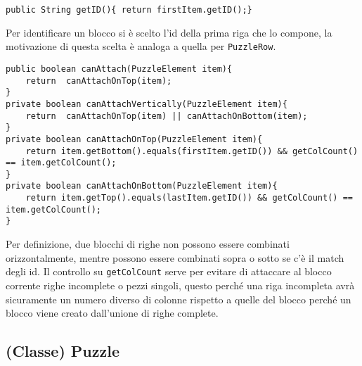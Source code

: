\documentclass[a4paper, 11pt]{article}
\begin{document}
\begin{lstlisting}
public String getID(){ return firstItem.getID();}
\end{lstlisting}
Per identificare un blocco si è scelto l'id della prima riga che lo compone, la motivazione di questa scelta è analoga a quella per \texttt{PuzzleRow}.

\begin{lstlisting}
public boolean canAttach(PuzzleElement item){
    return  canAttachOnTop(item);
}
private boolean canAttachVertically(PuzzleElement item){
    return  canAttachOnTop(item) || canAttachOnBottom(item);
}
private boolean canAttachOnTop(PuzzleElement item){
    return item.getBottom().equals(firstItem.getID()) && getColCount() == item.getColCount();
}
private boolean canAttachOnBottom(PuzzleElement item){
    return item.getTop().equals(lastItem.getID()) && getColCount() == item.getColCount();
}
\end{lstlisting}
Per definizione, due blocchi di righe non possono essere combinati orizzontalmente, mentre possono essere combinati sopra o sotto se c'è il match degli id.
Il controllo su \texttt{getColCount} serve per evitare di attaccare al blocco corrente righe incomplete o pezzi singoli, questo perché una riga incompleta avrà sicuramente un numero diverso di colonne rispetto a quelle del blocco perché un blocco viene creato dall'unione di righe complete.

\subsection{(Classe) Puzzle}
\end{document}
